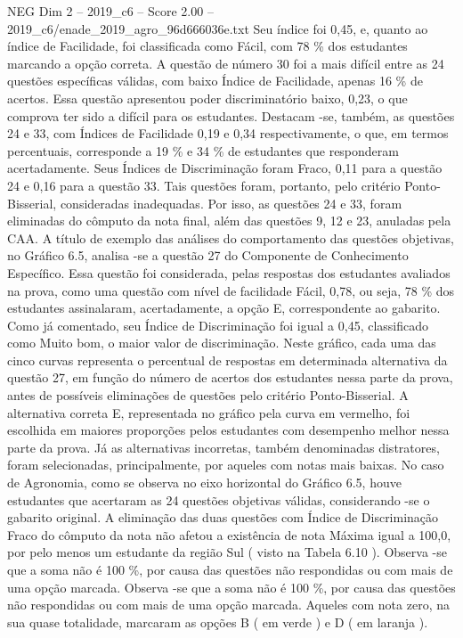 \begin{textsample}{NEG Dim 2 – 2019\_c6 – Score 2.00 – 2019\_c6/enade\_2019\_agro\_96d666036e.txt}
Seu índice foi 0,45, e, quanto ao índice de Facilidade, foi classificada como Fácil, com 78 \% dos estudantes marcando a opção correta.
A questão de número 30 foi a mais difícil entre as 24 questões específicas válidas, com baixo Índice de Facilidade, apenas 16 \% de acertos.
Essa questão apresentou poder discriminatório baixo, 0,23, o que comprova ter sido a difícil para os estudantes.
Destacam -se, também, as questões 24 e 33, com Índices de Facilidade 0,19 e 0,34 respectivamente, o que, em termos percentuais, corresponde a 19 \% e 34 \% de estudantes que responderam acertadamente.
Seus Índices de Discriminação foram Fraco, 0,11 para a questão 24 e 0,16 para a questão 33.
Tais questões foram, portanto, pelo critério Ponto-Bisserial, consideradas inadequadas.
Por isso, as questões 24 e 33, foram eliminadas do cômputo da nota final, além das questões 9, 12 e 23, anuladas pela CAA.
A título de exemplo das análises do comportamento das questões objetivas, no Gráfico 6.5, analisa -se a questão 27 do Componente de Conhecimento Específico.
Essa questão foi considerada, pelas respostas dos estudantes avaliados na prova, como uma questão com nível de facilidade Fácil, 0,78, ou seja, 78 \% dos estudantes assinalaram, acertadamente, a opção E, correspondente ao gabarito.
Como já comentado, seu Índice de Discriminação foi igual a 0,45, classificado como Muito bom, o maior valor de discriminação.
Neste gráfico, cada uma das cinco curvas representa o percentual de respostas em determinada alternativa da questão 27, em função do número de acertos dos estudantes nessa parte da prova, antes de possíveis eliminações de questões pelo critério Ponto-Bisserial.
A alternativa correta E, representada no gráfico pela curva em vermelho, foi escolhida em maiores proporções pelos estudantes com desempenho melhor nessa parte da prova.
Já as alternativas incorretas, também denominadas distratores, foram selecionadas, principalmente, por aqueles com notas mais baixas.
No caso de Agronomia, como se observa no eixo horizontal do Gráfico 6.5, houve estudantes que acertaram as 24 questões objetivas válidas, considerando -se o gabarito original.
A eliminação das duas questões com Índice de Discriminação Fraco do cômputo da nota não afetou a existência de nota Máxima igual a 100,0, por pelo menos um estudante da região Sul ( visto na Tabela 6.10 ).
Observa -se que a soma não é 100 \%, por causa das questões não respondidas ou com mais de uma opção marcada.
Observa -se que a soma não é 100 \%, por causa das questões não respondidas ou com mais de uma opção marcada.
Aqueles com nota zero, na sua quase totalidade, marcaram as opções B ( em verde ) e D ( em laranja ).

\end{textsample}
